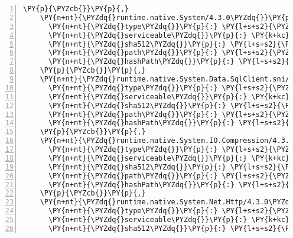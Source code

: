 \begin{Verbatim}[commandchars=\\\{\},numbers=left,firstnumber=1,stepnumber=1,numberblanklines=0]
    \PY{p}{\PYZcb{}}\PY{p}{,}
    \PY{n+nt}{\PYZdq{}runtime.native.System/4.3.0\PYZdq{}}\PY{p}{:} \PY{p}{\PYZob{}}
      \PY{n+nt}{\PYZdq{}type\PYZdq{}}\PY{p}{:} \PY{l+s+s2}{\PYZdq{}package\PYZdq{}}\PY{p}{,}
      \PY{n+nt}{\PYZdq{}serviceable\PYZdq{}}\PY{p}{:} \PY{k+kc}{true}\PY{p}{,}
      \PY{n+nt}{\PYZdq{}sha512\PYZdq{}}\PY{p}{:} \PY{l+s+s2}{\PYZdq{}sha512\PYZhy{}c/qWt2LieNZIj1jGnVNsE2Kl23Ya2aSTBuXMD6V7k9KWr6l16Tqdwq+hJScEpWER9753NWC8h96PaVNY5Ld7Jw==\PYZdq{}}\PY{p}{,}
      \PY{n+nt}{\PYZdq{}path\PYZdq{}}\PY{p}{:} \PY{l+s+s2}{\PYZdq{}runtime.native.system/4.3.0\PYZdq{}}\PY{p}{,}
      \PY{n+nt}{\PYZdq{}hashPath\PYZdq{}}\PY{p}{:} \PY{l+s+s2}{\PYZdq{}runtime.native.system.4.3.0.nupkg.sha512\PYZdq{}}
    \PY{p}{\PYZcb{}}\PY{p}{,}
    \PY{n+nt}{\PYZdq{}runtime.native.System.Data.SqlClient.sni/4.4.0\PYZdq{}}\PY{p}{:} \PY{p}{\PYZob{}}
      \PY{n+nt}{\PYZdq{}type\PYZdq{}}\PY{p}{:} \PY{l+s+s2}{\PYZdq{}package\PYZdq{}}\PY{p}{,}
      \PY{n+nt}{\PYZdq{}serviceable\PYZdq{}}\PY{p}{:} \PY{k+kc}{true}\PY{p}{,}
      \PY{n+nt}{\PYZdq{}sha512\PYZdq{}}\PY{p}{:} \PY{l+s+s2}{\PYZdq{}sha512\PYZhy{}A8v6PGmk+UGbfWo5Ixup0lPM4swuSwOiayJExZwKIOjTlFFQIsu3QnDXECosBEyrWSPryxBVrdqtJyhK3BaupQ==\PYZdq{}}\PY{p}{,}
      \PY{n+nt}{\PYZdq{}path\PYZdq{}}\PY{p}{:} \PY{l+s+s2}{\PYZdq{}runtime.native.system.data.sqlclient.sni/4.4.0\PYZdq{}}\PY{p}{,}
      \PY{n+nt}{\PYZdq{}hashPath\PYZdq{}}\PY{p}{:} \PY{l+s+s2}{\PYZdq{}runtime.native.system.data.sqlclient.sni.4.4.0.nupkg.sha512\PYZdq{}}
    \PY{p}{\PYZcb{}}\PY{p}{,}
    \PY{n+nt}{\PYZdq{}runtime.native.System.IO.Compression/4.3.0\PYZdq{}}\PY{p}{:} \PY{p}{\PYZob{}}
      \PY{n+nt}{\PYZdq{}type\PYZdq{}}\PY{p}{:} \PY{l+s+s2}{\PYZdq{}package\PYZdq{}}\PY{p}{,}
      \PY{n+nt}{\PYZdq{}serviceable\PYZdq{}}\PY{p}{:} \PY{k+kc}{true}\PY{p}{,}
      \PY{n+nt}{\PYZdq{}sha512\PYZdq{}}\PY{p}{:} \PY{l+s+s2}{\PYZdq{}sha512\PYZhy{}INBPonS5QPEgn7naufQFXJEp3zX6L4bwHgJ/ZH78aBTpeNfQMtf7C6VrAFhlq2xxWBveIOWyFzQjJ8XzHMhdOQ==\PYZdq{}}\PY{p}{,}
      \PY{n+nt}{\PYZdq{}path\PYZdq{}}\PY{p}{:} \PY{l+s+s2}{\PYZdq{}runtime.native.system.io.compression/4.3.0\PYZdq{}}\PY{p}{,}
      \PY{n+nt}{\PYZdq{}hashPath\PYZdq{}}\PY{p}{:} \PY{l+s+s2}{\PYZdq{}runtime.native.system.io.compression.4.3.0.nupkg.sha512\PYZdq{}}
    \PY{p}{\PYZcb{}}\PY{p}{,}
    \PY{n+nt}{\PYZdq{}runtime.native.System.Net.Http/4.3.0\PYZdq{}}\PY{p}{:} \PY{p}{\PYZob{}}
      \PY{n+nt}{\PYZdq{}type\PYZdq{}}\PY{p}{:} \PY{l+s+s2}{\PYZdq{}package\PYZdq{}}\PY{p}{,}
      \PY{n+nt}{\PYZdq{}serviceable\PYZdq{}}\PY{p}{:} \PY{k+kc}{true}\PY{p}{,}
      \PY{n+nt}{\PYZdq{}sha512\PYZdq{}}\PY{p}{:} \PY{l+s+s2}{\PYZdq{}sha512\PYZhy{}ZVuZJqnnegJhd2k/PtAbbIcZ3aZeITq3sj06oKfMBSfphW3HDmk/t4ObvbOk/JA/swGR0LNqMksAh/f7gpTROg==\PYZdq{}}\PY{p}{,}

\end{Verbatim}
